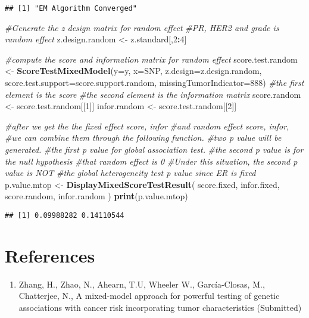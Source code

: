 \documentclass[11pt,]{article}
\newenvironment{Shaded}{\begin{snugshade}}{\end{snugshade}}
\newcommand{\KeywordTok}[1]{\textcolor[rgb]{0.13,0.29,0.53}{\textbf{#1}}}
\newcommand{\DataTypeTok}[1]{\textcolor[rgb]{0.13,0.29,0.53}{#1}}
\newcommand{\DecValTok}[1]{\textcolor[rgb]{0.00,0.00,0.81}{#1}}
\newcommand{\StringTok}[1]{\textcolor[rgb]{0.31,0.60,0.02}{#1}}
\newcommand{\CommentTok}[1]{\textcolor[rgb]{0.56,0.35,0.01}{\textit{#1}}}
\newcommand{\OperatorTok}[1]{\textcolor[rgb]{0.81,0.36,0.00}{\textbf{#1}}}
\newcommand{\NormalTok}[1]{#1}
\providecommand{\tightlist}{%
\setlength{\itemsep}{0pt}\setlength{\parskip}{0pt}}
\begin{document}
\begin{verbatim}
## [1] "EM Algorithm Converged"
\end{verbatim}

\begin{Shaded}
\begin{Highlighting}[]
\CommentTok{#Generate the z design matrix for random effect}
\CommentTok{#PR, HER2 and grade is random effect}
\NormalTok{z.design.random <-}\StringTok{ }\NormalTok{z.standard[,}\DecValTok{2}\OperatorTok{:}\DecValTok{4}\NormalTok{]}

\CommentTok{#compute the score and information matrix for random effect}
\NormalTok{score.test.random <-}\StringTok{ }\KeywordTok{ScoreTestMixedModel}\NormalTok{(}\DataTypeTok{y=}\NormalTok{y,}
                                         \DataTypeTok{x=}\NormalTok{SNP,}
                                         \DataTypeTok{z.design=}\NormalTok{z.design.random,}
                                         \DataTypeTok{score.test.support=}\NormalTok{score.support.random,}
                                         \DataTypeTok{missingTumorIndicator=}\DecValTok{888}\NormalTok{)}
\CommentTok{#the first element is the score}
\CommentTok{#the second element is the information matrix}
\NormalTok{score.random <-}\StringTok{ }\NormalTok{score.test.random[[}\DecValTok{1}\NormalTok{]]}
\NormalTok{infor.random <-}\StringTok{ }\NormalTok{score.test.random[[}\DecValTok{2}\NormalTok{]]}

\CommentTok{#after we get the the fixed effect score, infor }
\CommentTok{#and random effect score, infor, }
\CommentTok{#we can combine them through the following function. }
\CommentTok{#two p value will be generated.}
\CommentTok{#the first p value for global association test.}
\CommentTok{#the second p value is for the null hypothesis }
\CommentTok{#that random effect is 0}
\CommentTok{#Under this situation, the second p value is NOT }
\CommentTok{#the global heterogeneity test p value since ER is fixed}
\NormalTok{p.value.mtop <-}\StringTok{ }\KeywordTok{DisplayMixedScoreTestResult}\NormalTok{(}
\NormalTok{  score.fixed,}
\NormalTok{  infor.fixed,}
\NormalTok{  score.random,}
\NormalTok{  infor.random}
\NormalTok{)  }
\KeywordTok{print}\NormalTok{(p.value.mtop)}
\end{Highlighting}
\end{Shaded}

\begin{verbatim}
## [1] 0.09988282 0.14110544
\end{verbatim}

\section{References}\label{references}

\begin{enumerate}
\def\labelenumi{\arabic{enumi}.}
\tightlist
\item
  Zhang, H., Zhao, N., Ahearn, T.U, Wheeler W., García-Closas, M.,
  Chatterjee, N., A mixed-model approach for powerful testing of genetic
  associations with cancer risk incorporating tumor characteristics
  (Submitted)
\end{enumerate}




\newpage
\singlespacing 
\end{document}
